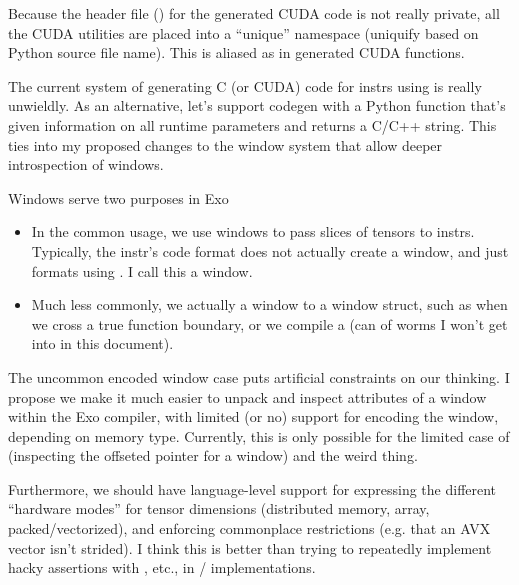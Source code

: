 \filbreak
Because the header file () for the generated CUDA code is not really private, all the CUDA utilities are placed into a ``unique'' namespace (uniquify based on Python source file name).
This is aliased as  in generated CUDA functions.

\filbreak
{}

The current system of generating C (or CUDA) code for instrs using  is really unwieldly.
As an alternative, let's support codegen with a Python function that's given information on all runtime parameters and returns a C/C++ string.
This ties into my proposed changes to the window system that allow deeper introspection of windows.

\newpage
{}
\label{ch:Windows}

Windows serve two purposes in Exo
\begin{itemize}
 \item In the common usage, we use windows to pass slices of tensors to instrs.
 Typically, the instr's code format does not actually create a window, and just formats using .
 I call this a  window.
 \item Much less commonly, we actually  a window to a window struct, such as when we cross a true function boundary, or we compile a  (can of worms I won't get into in this document).
\end{itemize}
\filbreak
The uncommon encoded window case puts artificial constraints on our thinking.
I propose we make it much easier to unpack and inspect attributes of a window within the Exo compiler, with limited (or no) support for encoding the window, depending on memory type.
Currently, this is only possible for the limited case of  (inspecting the offseted pointer for a window) and the weird  thing.

\filbreak
Furthermore, we should have language-level support for expressing the different ``hardware modes'' for tensor dimensions (distributed memory, array, packed/vectorized), and enforcing commonplace restrictions (e.g. that an AVX vector isn't strided).
I think this is better than trying to repeatedly implement hacky assertions with , etc., in / implementations.

\filbreak
{}

